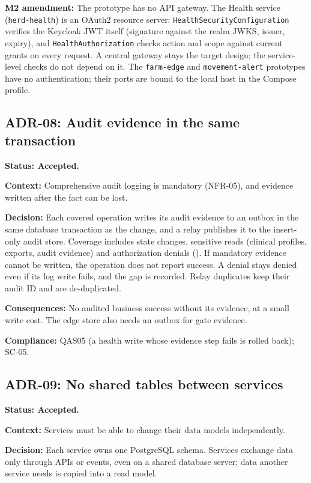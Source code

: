 {\sloppy \textbf{M2 amendment:} The prototype has no API gateway. The Health
service (\texttt{herd-health}) is an OAuth2 resource server:
\texttt{HealthSecurityConfiguration} verifies the Keycloak JWT itself
(signature against the realm JWKS, issuer, expiry), and
\texttt{HealthAuthorization} checks action and scope against current
grants on every request. A central gateway stays the target design; the
service-level checks do not depend on it. The \texttt{farm-edge} and
\texttt{movement-alert} prototypes have no authentication; their ports are
bound to the local host in the Compose profile.\par}

\subsection{ADR-08: Audit evidence in the same transaction}\label{adr:08}

\textbf{Status: Accepted.}

\textbf{Context:} Comprehensive audit logging is mandatory (NFR-05), and
evidence written after the fact can be lost.

\textbf{Decision:} Each covered operation writes its audit evidence to
an outbox in the same database transaction as the change, and a relay
publishes it to the insert-only audit store. Coverage includes state
changes, sensitive reads (clinical profiles, exports, audit evidence)
and authorization denials (). If mandatory evidence cannot
be written, the operation does not report success. A denial stays denied
even if its log write fails, and the gap is recorded. Relay duplicates
keep their audit ID and are de-duplicated.

\textbf{Consequences:} No audited business success without its evidence,
at a small write cost. The edge store also needs an outbox for gate
evidence.

\textbf{Compliance:} QAS05 (a health write whose evidence step fails is
rolled back); SC-05.

\subsection{ADR-09: No shared tables between services}\label{adr:09}

\textbf{Status: Accepted.}

\textbf{Context:} Services must be able to change their data models
independently.

\textbf{Decision:} Each service owns one PostgreSQL schema. Services
exchange data only through APIs or events, even on a shared database
server; data another service needs is copied into a read model.

